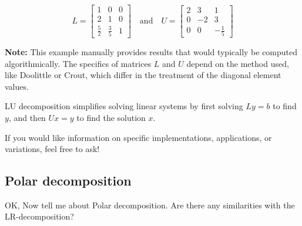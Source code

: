 \begin{airesult}
\[
L = \begin{bmatrix}
1 & 0 & 0 \\
2 & 1 & 0 \\
\frac{5}{2} & \frac{3}{5} & 1
\end{bmatrix}
\quad \text{and} \quad
U = \begin{bmatrix}
2 & 3 & 1 \\
0 & -2 & 3 \\
0 & 0 & -\frac{1}{5}
\end{bmatrix}
\]

\textbf{Note:} This example manually provides results that would typically be computed
algorithmically. The specifics of matrices \(L\) and \(U\) depend on the method used, like Doolittle
or Crout, which differ in the treatment of the diagonal element values.

LU decomposition simplifies solving linear systems by first solving \(Ly = b\) to find \(y\), and
then \(Ux = y\) to find the solution \(x\).

If you would like information on specific implementations, applications, or variations, feel free to
ask!
\end{airesult}

\subsection{Polar decomposition}

\begin{ai}
OK, Now tell me about Polar decomposition. Are there any similarities with the LR-decomposition?
\end{ai}



